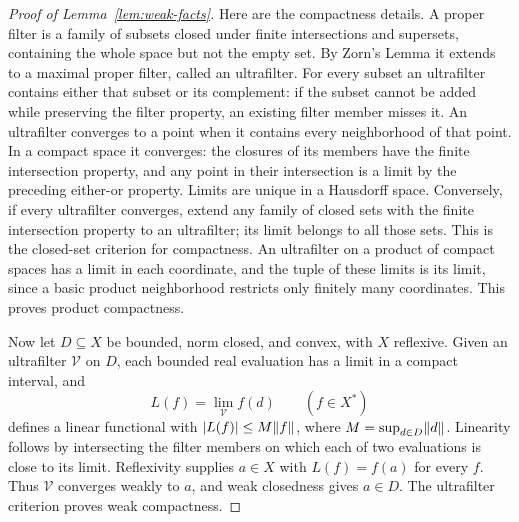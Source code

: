 \begin{proof}[Proof of Lemma~\ref{lem:weak-facts}]
Here are the compactness details. A proper filter is a family of subsets
closed under finite intersections and supersets, containing the whole
space but not the empty set. By Zorn's Lemma it extends to a maximal proper
filter, called an ultrafilter. For every subset an ultrafilter contains
either that subset or its complement: if the subset cannot be added while
preserving the filter property, an existing filter member misses it.
An ultrafilter converges to a point when it contains every neighborhood
of that point. In a compact space it converges: the closures of its members
have the finite intersection property, and any point in their intersection
is a limit by the preceding either-or property. Limits are unique in a
Hausdorff space. Conversely, if every ultrafilter converges, extend any
family of closed sets with the finite intersection property to an
ultrafilter; its limit belongs to all those sets. This is the closed-set
criterion for compactness. An ultrafilter on a product of compact spaces
has a limit in each coordinate, and the tuple of these limits is its
limit, since a basic product neighborhood restricts only finitely many
coordinates. This proves product compactness.

Now let $D\subseteq X$ be bounded, norm closed, and convex, with $X$
reflexive. Given an ultrafilter $\mathcal V$ on $D$, each bounded real
evaluation has a limit in a compact interval, and
\[
             L(f)=\lim_{\mathcal V} f(d)\qquad(f\in X^*)
\]
defines a linear functional with $\lvert L(f)\rvert\leq M\lVert f\rVert$, where
$M=\sup_{d\in D}\lVert d\rVert$. Linearity follows by intersecting the filter
members on which each of two evaluations is close to its limit.
Reflexivity supplies $a\in X$ with $L(f)=f(a)$ for every $f$.
Thus $\mathcal V$ converges weakly to $a$, and weak closedness gives
$a\in D$. The ultrafilter criterion proves weak compactness.
\end{proof}
